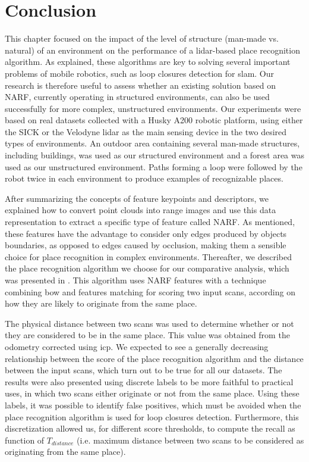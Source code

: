 \section{Conclusion}
\label{sec:chap_slam_conclu}

This chapter focused on the impact of the level of structure (man-made vs. natural) of an environment on the performance of a \gls*{lidar}-based place recognition algorithm. As explained, these algorithms are key to solving several important problems of mobile robotics, such as loop closures detection for \gls*{slam}. Our research is therefore useful to assess whether an existing solution based on NARF, currently operating in structured environments, can also be used successfully for more complex, unstructured environments. Our experiments were based on real datasets collected with a Husky A200 robotic platform, using either the SICK or the Velodyne \gls*{lidar} as the main sensing device in the two desired types of environments. An outdoor area containing several man-made structures, including buildings, was used as our structured environment and a forest area was used as our unstructured environment. Paths forming a loop were followed by the robot twice in each environment to produce examples of recognizable places.

After summarizing the concepts of feature keypoints and descriptors, we explained how to convert point clouds into range images and use this data representation to extract a specific type of feature called NARF. As mentioned, these features have the advantage to consider only edges produced by objects boundaries, as opposed to edges caused by occlusion, making them a sensible choice for place recognition in complex environments. Thereafter, we described the place recognition algorithm we choose for our comparative analysis, which was presented in \citep{Steder2011b}. This algorithm uses NARF features with a technique combining \gls*{bow} and features matching for scoring two input scans, according on how they are likely to originate from the same place. 

The physical distance between two scans was used to determine whether or not they are considered to be in the same place. This value was obtained from the odometry corrected using \gls*{icp}. We expected to see a generally decreasing relationship between the score of the place recognition algorithm and the distance between the input scans, which turn out to be true for all our datasets. The results were also presented using discrete labels to be more faithful to practical uses, in which two scans either originate or not from the same place. Using these labels, it was possible to identify false positives, which must be avoided when the place recognition algorithm is used for loop closures detection. Furthermore, this discretization allowed us, for different score thresholds, to compute the recall as function of $T_{distance}$ (i.e. maximum distance between two scans to be considered as originating from the same place).

